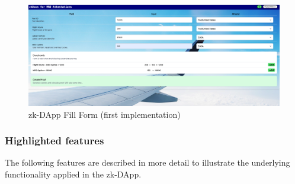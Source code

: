 \begin{figure}[hbt]
	\centering
		\includegraphics[width=1.0\textwidth]{Pictures/form.png}
	\caption{zk-DApp Fill Form (first implementation)}
	\label{fig:form}
\end{figure}

\subsubsection{Highlighted features}
The following features are described in more detail to illustrate the underlying functionality applied in the zk-DApp.

